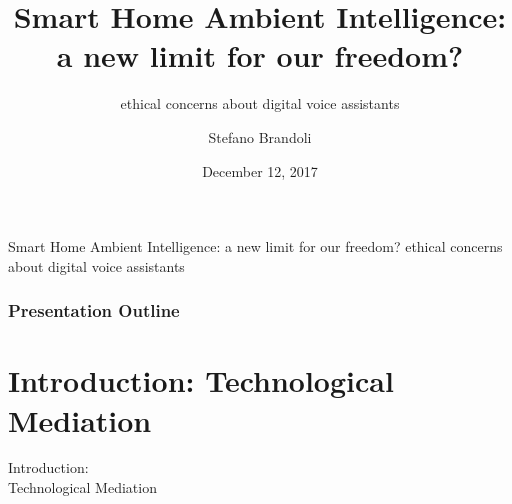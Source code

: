 \documentclass{beamer}
\title{Smart Home Ambient Intelligence: \\a new limit for our freedom?}
\subtitle{\vspace*{0.3cm}ethical concerns about digital voice assistants}
\author[Stefano Brandoli]{Stefano Brandoli}
\institute[PoliMi]{Politecnico di Milano}
\date{December 12, 2017}
\begin{document}
\begin{frame}
\maketitle
\end{frame}

\begin{frame}
\begin{center}{\vspace*{-0.5cm}Smart Home Ambient Intelligence: a new limit for our freedom?
ethical concerns about digital voice assistants}
\end{center}
\frametitle{Presentation Outline}

\tableofcontents
\end{frame}

\section{Introduction: Technological Mediation}

\begin{frame}
\begin{center}
	 Introduction:\\Technological Mediation
\end{center}
\end{frame}
\end{document}
